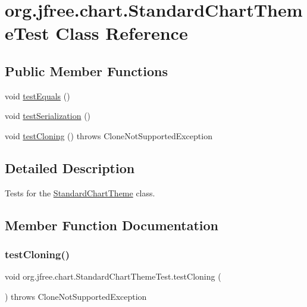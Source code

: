 \hypertarget{classorg_1_1jfree_1_1chart_1_1_standard_chart_theme_test}{}\section{org.\+jfree.\+chart.\+Standard\+Chart\+Theme\+Test Class Reference}
\label{classorg_1_1jfree_1_1chart_1_1_standard_chart_theme_test}
\subsection*{Public Member Functions}
\begin{DoxyCompactItemize}
\item 
void \mbox{\hyperlink{classorg_1_1jfree_1_1chart_1_1_standard_chart_theme_test_ad431a6f8f8f7981763f77c60e11dbfcb}{test\+Equals}} ()
\item 
void \mbox{\hyperlink{classorg_1_1jfree_1_1chart_1_1_standard_chart_theme_test_a3d1834e40109e5b4dadf2221121c9e69}{test\+Serialization}} ()
\item 
void \mbox{\hyperlink{classorg_1_1jfree_1_1chart_1_1_standard_chart_theme_test_a06f4ed5fad216cc5bba2908893ff1f7e}{test\+Cloning}} ()  throws Clone\+Not\+Supported\+Exception 
\end{DoxyCompactItemize}


\subsection{Detailed Description}
Tests for the \mbox{\hyperlink{classorg_1_1jfree_1_1chart_1_1_standard_chart_theme}{Standard\+Chart\+Theme}} class. 

\subsection{Member Function Documentation}
\mbox{\label{classorg_1_1jfree_1_1chart_1_1_standard_chart_theme_test_a06f4ed5fad216cc5bba2908893ff1f7e}} 
\subsubsection{\texorpdfstring{test\+Cloning()}{testCloning()}}
{\footnotesize\ttfamily void org.\+jfree.\+chart.\+Standard\+Chart\+Theme\+Test.\+test\+Cloning (\begin{DoxyParamCaption}{ }\end{DoxyParamCaption}) throws Clone\+Not\+Supported\+Exception}

